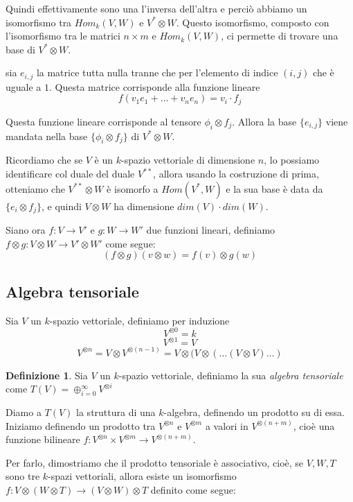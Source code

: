 \documentclass[12pt, a4paper]{article}
\theoremstyle{definition}
\newtheorem{defi}{Definizione}
\begin{document}
Quindi effettivamente sono una l'inversa dell'altra e perciò abbiamo un isomorfismo tra $Hom_k(V, W)$ e $V^{*} \otimes W$. Questo isomorfismo, composto con l'isomorfismo tra le matrici $n \times m$
e $Hom_k(V, W)$, ci permette di trovare una base di $V^{*} \otimes W$.

sia $e_{i, j}$ la matrice tutta nulla tranne che per l'elemento di indice $(i, j)$ che è uguale a $1$. Questa matrice corrisponde alla funzione lineare
$$f(v_1 e_1 + \ldots + v_n e_n) = v_i \cdot f_j$$

Questa funzione lineare corrisponde al tensore $\phi_i \otimes f_j$. Allora la base $\{e_{i, j}\}$ viene mandata nella base $\{\phi_i \otimes f_j\}$ di $V^{*} \otimes W$.

Ricordiamo che se $V$ è un $k$-spazio vettoriale di dimensione $n$, lo possiamo identificare col duale del duale $V^{**}$, allora usando la costruzione di prima, otteniamo che
$V^{**} \otimes W$ è isomorfo a $Hom(V^{*}, W)$ e la sua base è data da $\{e_i \otimes f_j\}$, e quindi $V \otimes W$ ha dimensione $dim(V) \cdot dim(W)$.

Siano ora $f : V \to V'$  e $g : W \to W'$ due funzioni lineari, definiamo $f \otimes g : V \otimes W \to V' \otimes W'$ come segue:
$$(f \otimes g)(v \otimes w) = f(v) \otimes g(w)$$

\subsection{Algebra tensoriale} \label{sec:algebra-tensoriale}
Sia $V$ un $k$-spazio vettoriale, definiamo per induzione
$$V^{\otimes 0} = k$$
$$V^{\otimes 1} = V$$
$$V^{\otimes n} = V \otimes V^{\otimes (n-1)} = V \otimes (V \otimes (\ldots(V \otimes V)\ldots)$$

\begin{defi} \label{def:algebra-tensoriale}
Sia $V$ un $k$-spazio vettoriale, definiamo la sua \emph{algebra tensoriale} come $T(V) = \oplus_{i = 0}^{\infty} V^{\otimes i}$
\end{defi}

Diamo a $T(V)$ la struttura di una $k$-algebra, definendo un prodotto su di essa. Iniziamo definendo un prodotto tra $V^{\otimes n}$ e $V^{\otimes m}$ a valori in $V^{\otimes (n+m)}$,
cioè una funzione bilineare $f : V^{\otimes n} \times V^{\otimes m} \to V^{\otimes (n+m)}$.

Per farlo, dimostriamo che il prodotto tensoriale è associativo, cioè, se $V, W, T$ sono tre $k$-spazi vettoriali, allora esiste un isomorfismo
$f : V \otimes (W \otimes T) \to (V \otimes W) \otimes T$ definito come segue:
\end{document}
